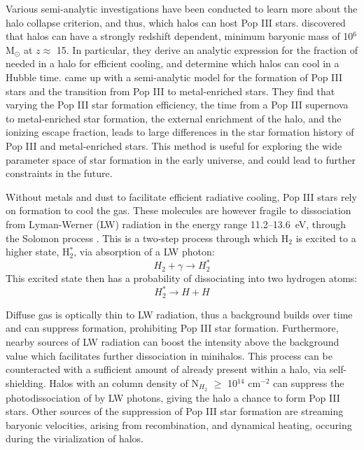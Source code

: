 \documentclass[a4paper,fleqn,usenatbib]{mnras}
\begin{document}
Various semi-analytic investigations have been conducted to learn more about the halo collapse criterion, and thus, which halos can host Pop III stars. \citet{Tegmark97} discovered that halos can have a strongly redshift dependent, minimum baryonic mass of 10$^{6}$ M$_{\odot}$ at $z \approx$ 15. In particular, they derive an analytic expression for the fraction of \hh{} needed in a halo for efficient cooling, and determine which  halos can cool in a Hubble time. \citet{Visbal18} came up with a semi-analytic model for the formation of Pop III stars and the transition from Pop III to metal-enriched stars. They find that varying the Pop III star formation efficiency, the time from a Pop III supernova to metal-enriched star formation, the external enrichment of the halo, and the ionizing escape fraction, leads to large differences in the star formation history of Pop III and metal-enriched stars. This method is useful for exploring the wide parameter space of star formation in the early universe, and could lead to further constraints in the future. 

Without metals and dust to facilitate efficient radiative cooling, Pop III stars rely on \hh{} formation to cool the gas. These molecules are however fragile to dissociation from Lyman-Werner (LW) radiation in the energy range 11.2--13.6~eV, through the Solomon process \citep{Field66, Stecher67}. This is a two-step process through which H$_{2}$ is excited to a higher state, H$_{2}^{\ast}$, via absorption of a LW photon:
\begin{equation} \label{Solomon1}
	H_{2} + \gamma \rightarrow  H_{2}^{\ast}
\end{equation}
This excited state then has a probability of dissociating into two hydrogen atoms:
\begin{equation} \label{Solomon2}
	H_{2}^{\ast} \rightarrow H + H
\end{equation}

Diffuse gas is optically thin to LW radiation, thus a background builds over time and can suppress \hh{} formation, prohibiting Pop III star formation. Furthermore, nearby sources of LW radiation can boost the intensity above the background value which facilitates further \hh{} dissociation in minihalos. This process can be counteracted with a sufficient amount of \hh{} already present within a halo, via \hh{} self-shielding. Halos with an \hh{} column density of N$_{H_{2}}$ $\geq$ 10$^{14}$ cm$^{-2}$ can suppress the photodissociation of \hh{} by LW photons, giving the halo a chance to form Pop III stars. Other sources of the suppression of Pop III star formation are streaming baryonic velocities, arising from recombination, and dynamical heating, occuring during the virialization of halos. 
\end{document}
